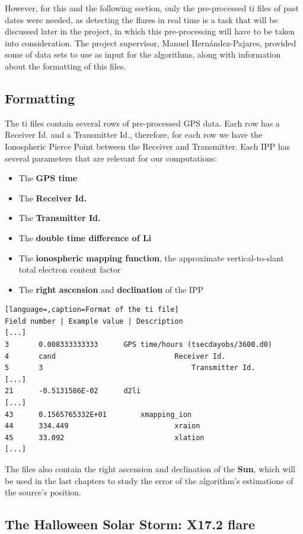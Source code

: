 However, for this and the following section, only the pre-processed ti files of past dates were needed, as detecting the flares in real time is a task that will be discussed later in the project, in which this pre-processing will have to be taken into consideration. The project supervisor, Manuel Hernández-Pajares, provided some of data sets to use as input for the algorithms, along with information about the formatting of this files.

\subsection{Formatting}

The ti files contain several rows of pre-processed GPS data. Each row has a Receiver Id. and a Transmitter Id., therefore, for each row we have the Ionospheric Pierce Point between the Receiver and Transmitter. Each IPP has several parameters that are relevant for our computations:

\begin{itemize}
\item The \textbf{GPS time}
\item The \textbf{Receiver Id.}
\item The \textbf{Transmitter Id.}
\item The \textbf{double time difference of Li}
\item The \textbf{ionospheric mapping function}, the approximate vertical-to-slant total electron content factor
\item The \textbf{right ascension} and \textbf{declination} of the IPP
\end{itemize}

\begin{minipage}{\linewidth}
\begin{lstlisting}[language=,caption=Format of the ti file]
Field number | Example value | Description
[...]
3 		0.008333333333		GPS time/hours (tsecdayobs/3600.d0)
4 		cand							Receiver Id.
5 		3									Transmitter Id.
[...]
21 		-0.5131586E-02		d2li
[...]
43 		0.1565765332E+01		xmapping_ion
44 		334.449							xraion
45 		33.092							xlation
[...]
\end{lstlisting}
\end{minipage}
The files also contain the right ascension and declination of the \textbf{Sun}, which will be used in the last chapters to study the error of the algorithm's estimations of the source's position.

\subsection{The Halloween Solar Storm: X17.2 flare}

